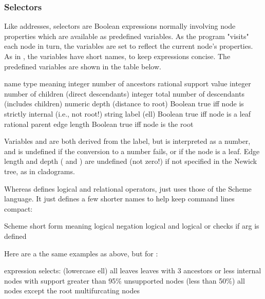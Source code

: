 \subsubsection{Selectors}

Like \ed{} addresses, \sched{} selectors are Boolean expressions normally
involving node properties which are available as predefined variables. As the
program "visits" each node in turn, the variables are set to reflect the current
node's properties. As in \ed{}, the variables have short names, to keep
expressions concise. The predefined variables are shown in the table below.

\startalignment[center]
\starttabulate[|c|l|l|]
\NC name \NC type \NC meaning \NC\NR
\HL
\NC {} \NC integer \NC number of ancestors  \NC\NR
\NC {} \NC rational \NC support value \NC\NR
\NC {} \NC integer \NC number of children (direct descendants) \NC\NR
\NC {} \NC integer \NC total number of descendants (includes children) \NC\NR
\NC {} \NC numeric \NC depth (distance to root) \NC\NR
\NC {} \NC Boolean \NC true iff node is strictly internal (i.e., not root!) \NC\NR
\NC {} \NC string \NC label \NC\NR
\NC {} (ell) \NC Boolean \NC true iff node is a leaf \NC\NR
\NC {} \NC rational \NC parent edge length \NC\NR
\NC {} \NC Boolean \NC true iff node is the root \NC\NR
\stoptabulate
\stopalignment

Variables  and  are both derived from the
label, but  is interpreted as a number, and is undefined if the
conversion to a number fails, or if the node is a leaf. Edge length and depth
( and ) are undefined (not zero!) if not specified in the
Newick tree, as in cladograms.

Whereas \ed{} defines logical and relational operators, \sched{} just uses those
of the Scheme language. It just defines a few shorter names to help keep command
lines compact:

\startalignment[center]
\starttabulate[|l|c|l|]
\NC Scheme \NC \sched{} short form \NC meaning \NC\NR
\HL
\NC {} 	\NC \code{!} 	\NC logical negation \NC\NR
\NC {} 	\NC \code{\&} 	\NC logical and \NC\NR
\NC {}  	\NC \code{\|} 	\NC logical or \NC\NR
\NC {} \NC {}	\NC checks if arg is defined  \NC\NR
\stoptabulate
\stopalignment

Here are a the same examples as above, but for \sched:

\startalignment[center]
\starttabulate[|c|l|]
expression \NC selects: \NC\NR
\HL
{} (lowercase ell) \NC all leaves \NC\NR
{} \NC leaves with 3 ancestors or less \NC\NR
{} \NC internal nodes with support greater than 95\% \NC\NR
{} \NC unsupported nodes (less than 50\%) \NC\NR
{} \NC all nodes except the root \NC\NR
{} \NC multifurcating nodes
\stoptabulate
\stopalignment

